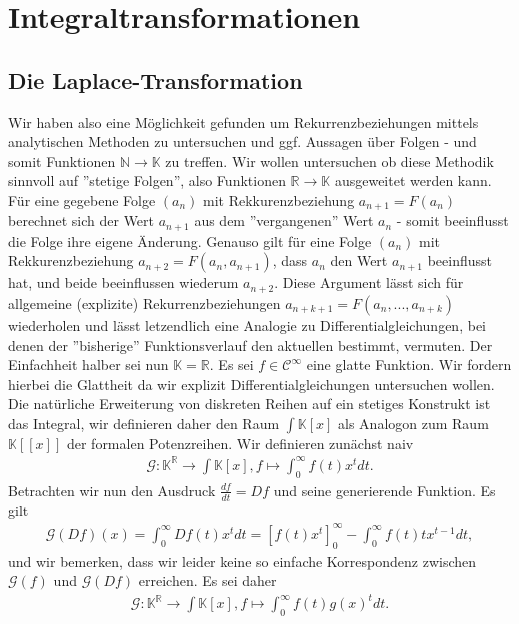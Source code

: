 \documentclass[a4paper,11pt]{article}
\theoremstyle{mytheor}
\newcommand{\N}[0]{\mathbb{N}}
\newcommand{\R}[0]{\mathbb{R}}
\newcommand{\K}[0]{\mathbb{K}}
\begin{document}
\section{Integraltransformationen}

\subsection*{Die Laplace-Transformation}

Wir haben also eine Möglichkeit gefunden um Rekurrenzbeziehungen mittels analytischen Methoden zu untersuchen und ggf. Aussagen über Folgen - und somit Funktionen $\N \to \K$ zu treffen. Wir wollen untersuchen ob diese Methodik sinnvoll auf ''stetige Folgen'', also Funktionen $\R \to \K$ ausgeweitet werden kann.
Für eine gegebene Folge $(a_n)$ mit Rekkurenzbeziehung $a_{n+1} = F(a_n)$ berechnet sich der Wert $a_{n+1}$ aus dem ''vergangenen'' Wert $a_n$ - somit beeinflusst die Folge ihre eigene Änderung. Genauso gilt für eine Folge $(a_n)$ mit Rekkurenzbeziehung $a_{n+2} = F(a_n, a_{n+1})$, dass $a_n$ den Wert $a_{n+1}$ beeinflusst hat, und beide beeinflussen wiederum $a_{n+2}$. Diese Argument lässt sich für allgemeine (explizite) Rekurrenzbeziehungen $a_{n+k+1} = F(a_n, ..., a_{n+k})$ wiederholen und lässt letzendlich eine Analogie zu Differentialgleichungen, bei denen der ''bisherige'' Funktionsverlauf den aktuellen bestimmt, vermuten.
Der Einfachheit halber sei nun $\K = \R$. Es sei $f \in \mathcal{C}^\infty$ eine glatte Funktion. Wir fordern hierbei die Glattheit da wir explizit Differentialgleichungen untersuchen wollen. Die natürliche Erweiterung von diskreten Reihen auf ein stetiges Konstrukt ist das Integral, wir definieren daher den Raum $\int \K[x]$ als Analogon zum Raum $\K[[x]]$ der formalen Potenzreihen. Wir definieren zunächst naiv
\begin{align*}
    \mathcal{G} : \K^\R \to \int \K[x], f \mapsto \int_0^\infty f(t) x^t dt.
\end{align*}
Betrachten wir nun den Ausdruck $\frac{df}{dt}=Df$ und seine generierende Funktion. Es gilt
\begin{align*}
    \mathcal{G}(Df)(x) = \int_0^\infty Df(t) x^t dt = [f(t) x^t]_0^\infty - \int_0^\infty f(t) t  x^{t-1} dt,
\end{align*}
und wir bemerken, dass wir leider keine so einfache Korrespondenz zwischen $\mathcal{G}(f)$ und $\mathcal{G}(Df)$ erreichen. Es sei daher
\begin{align*}
    \mathcal{G} : \K^\R \to \int \K[x], f \mapsto \int_0^\infty f(t) g(x)^t dt.
\end{align*}
\end{document}
